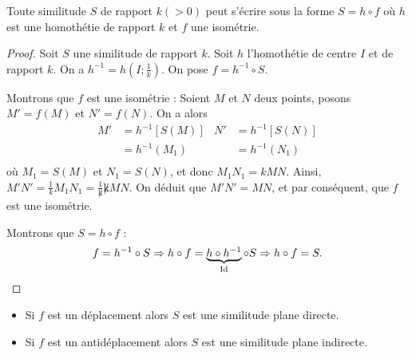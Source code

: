             \begin{thm}
                  Toute similitude $S$ de rapport $k (>0)$ peut s'\'ecrire sous la forme $S = h \circ f$
                  o\`u $h$ est une homoth\'etie de rapport $k$ et $f$ une isom\'etrie.
                  \begin{proof}
                        Soit $S$ une similitude de rapport $k$.
                        Soit $h$ l'homoth\'etie de centre $I$ et de rapport $k$.
                        On a $h^{-1} = h\left(I ; \frac{1}{k}\right)$.
                        On pose $f = h^{-1} \circ S$.
                        
                        Montrons que $f$ est une isom\'etrie : \newline
                              Soient $M$ et $N$ deux points, posons $M' = f(M)$ et $N' = f(N)$.
                              On a alors 
                              \begin{align*}
                                    M' & = h^{-1} \left[ S(M) \right]       & N' & = h^{-1} \left[ S(N) \right]      \\
                                       & = h^{-1} (M_1)                     &    & = h^{-1} (N_1)                    \\
                              \end{align*}
                              o\`u $M_1 = S(M)$ et $N_1 = S(N)$, et donc $M_1 N_1 = k MN$.
                              Ainsi, $M'N' = \frac{1}{k} M_1 N_1 = \frac{1}{\not k} \not k MN$.
                              On d\'eduit que $M'N' = MN$, et par cons\'equent, que $f$ est une isom\'etrie.
                              
                        Montrons que $S = h\circ f$ : \newline
                              \[
                                    f = h^{-1} \circ S 
                                          \Rightarrow 
                                                h \circ f = \underbrace{h \circ h^{-1}}_{\mathrm{Id}} \circ S
                                                      \Rightarrow
                                                            h \circ f = S.
                              \]
                  \end{proof}
                  \begin{itemize}
                        \item Si $f$ est un d\'eplacement alors $S$ est une similitude plane directe.
                        \item Si $f$ est un antid\'eplacement alors $S$ est une similitude plane indirecte.
                  \end{itemize}
            \end{thm}
